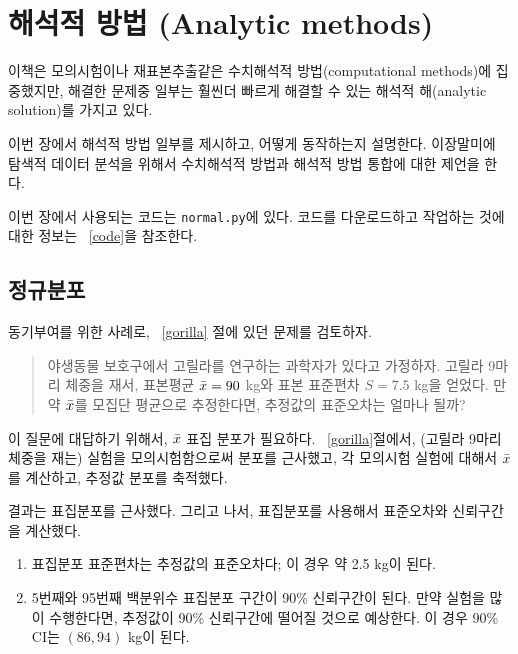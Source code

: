 
\chapter{해석적 방법 (Analytic methods)}
\label{analysis}

이책은 모의시험이나 재표본추출같은 수치해석적 방법(computational methods)에 집중했지만, 해결한 문제중 일부는 훨씬더 빠르게 해결할 수 있는 해석적 해(analytic solution)를 가지고 있다.

이번 장에서 해석적 방법 일부를 제시하고, 어떻게 동작하는지 설명한다. 이장말미에 탐색적 데이터 분석을 위해서 수치해석적 방법과 해석적 방법 통합에 대한 제언을 한다.

이번 장에서 사용되는 코드는 {\tt normal.py}에 있다.
코드를 다운로드하고 작업하는 것에 대한 정보는 ~\ref{code}을 참조한다.


\section{정규분포}
\label{why_normal}

동기부여를 위한 사례로, ~\ref{gorilla} 절에 있던 문제를 검토하자.

\begin{quotation}
\noindent 야생동물 보호구에서 고릴라를 연구하는 과학자가 있다고 가정하자. 고릴라 9마리 체중을 재서, 표본평균 $\bar{x}=90$ kg와 표본 표준편차 $S=7.5$ kg을 얻었다. 만약 $\bar{x}$를 모집단 평균으로 추정한다면, 추정값의 표준오차는 얼마나 될까?
\end{quotation}

이 질문에 대답하기 위해서, $\bar{x}$ 표집 분포가 필요하다. ~\ref{gorilla}절에서, (고릴라 9마리 체중을 재는) 실험을 모의시험함으로써 분포를 근사했고, 각 모의시험 실험에 대해서 $\bar{x}$를 계산하고, 추정값 분포를 축적했다.

결과는 표집분포를 근사했다. 그리고 나서, 표집분포를 사용해서 표준오차와 신뢰구간을 계산했다.

\begin{enumerate}

\item 표집분포 표준편차는 추정값의 표준오차다; 이 경우 약 2.5 kg이 된다.

\item 5번째와 95번째 백분위수 표집분포 구간이 90\% 신뢰구간이 된다. 만약 실험을 많이 수행한다면, 추정값이 90\% 신뢰구간에 떨어질 것으로 예상한다. 이 경우 90\% CI는 $(86, 94)$ kg이 된다.

\end{enumerate}

